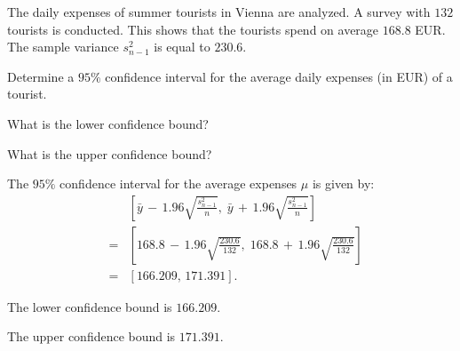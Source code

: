 
\begin{question}
The daily expenses of summer tourists in Vienna are analyzed. A
survey with $132$ tourists is conducted. This shows that the
tourists spend on average $168.8$ EUR. The sample variance
$s^2_{n-1}$ is equal to $230.6$.

Determine a $95\%$ confidence interval for the average daily
expenses (in EUR) of a tourist.

\begin{answerlist}
\item What is the lower confidence bound?
\item What is the upper confidence bound?
\end{answerlist}
\end{question}

\begin{solution}
The $95\%$ confidence interval for the average expenses $\mu$ is
given by:
\begin{eqnarray*}
&   & \left[\bar{y} \, - \, 1.96\sqrt{\frac{s_{n-1}^2}{n}}, \; 
  \bar{y} \, + \, 1.96\sqrt{\frac{s_{n-1}^2}{n}}\right] \\
& = & \left[ 168.8 \, - \, 1.96\sqrt{\frac{230.6}{132}}, \;
             168.8 \, + \, 1.96\sqrt{\frac{230.6}{132}}\right] \\
& = & \left[166.209, \, 171.391\right].
\end{eqnarray*}

\begin{answerlist}
\item The lower confidence bound is $166.209$.
\item The upper confidence bound is $171.391$.
\end{answerlist}
\end{solution}

